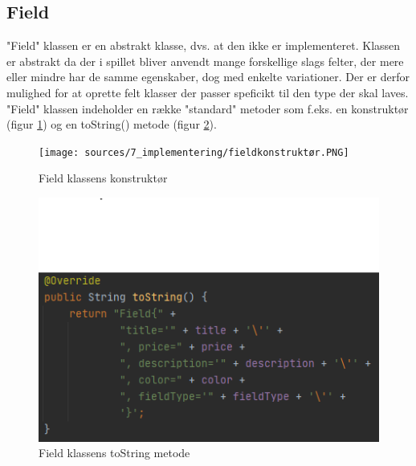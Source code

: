 \subsection{Field}
"Field" klassen er en abstrakt klasse, dvs. at den ikke er implementeret. Klassen er abstrakt da der i spillet bliver anvendt mange forskellige slags felter, der mere eller mindre har de samme egenskaber, dog med enkelte variationer. Der er derfor mulighed for at oprette felt klasser der passer speficikt til den type der skal laves. "Field" klassen indeholder en række "standard" metoder som f.eks. en konstruktør (figur \ref{fig:fieldKons}) og en toString() metode (figur \ref{fig:fieldString}).

\begin{figure}[H]
    \centering
    \texttt{[image: sources/7\_implementering/fieldkonstruktør.PNG]}
    \caption{Field klassens konstruktør}
    \label{fig:fieldKons}
\end{figure}
\begin{figure}[H]
    \centering
    \includegraphics{sources/7_implementering/fieldTostring.PNG}
    \caption{Field klassens toString metode}
    \label{fig:fieldString}
\end{figure}

